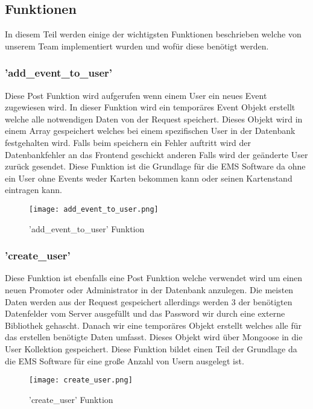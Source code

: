 			\subsection{Funktionen}
		 	In diesem Teil werden einige der wichtigsten Funktionen beschrieben welche von unserem Team implementiert wurden und wofür diese benötigt werden. 		 	
		 	\subsubsection{'add\_event\_to\_user'}
		 		Diese Post Funktion wird aufgerufen wenn einem User ein neues Event zugewiesen wird. In dieser Funktion wird ein temporäres Event Objekt erstellt welche alle notwendigen Daten von der Request speichert. Dieses Objekt wird in einem Array gespeichert welches bei einem spezifischen User in der Datenbank festgehalten wird. Falls beim speichern ein Fehler auftritt wird der Datenbankfehler an das Frontend geschickt anderen Falls wird der geänderte User zurück gesendet. Diese Funktion ist die Grundlage für die EMS Software da ohne ein User ohne Events weder Karten bekommen kann oder seinen Kartenstand eintragen kann.		 		
		 		\begin{figure}[H]
		 			\centering
		 			\texttt{[image: add\_event\_to\_user.png]}
		 			\caption{'add\_event\_to\_user' Funktion}
		 		\end{figure}	 	
		 	\subsubsection{'create\_user'}
		 		Diese Funktion ist ebenfalls eine Post Funktion welche verwendet wird um einen neuen Promoter oder Administrator in der Datenbank anzulegen. 
				 Die meisten Daten werden aus der Request gespeichert allerdings werden 3 der benötigten Datenfelder vom Server ausgefüllt und das Password wir durch eine externe Bibliothek gehascht. Danach wir eine temporäres Objekt erstellt welches alle für das erstellen benötigte Daten umfasst. Dieses Objekt wird über Mongoose in die User Kollektion gespeichert. Diese Funktion bildet einen Teil der Grundlage da die EMS Software für eine große Anzahl von Usern ausgelegt ist. 		 		
		 		\begin{figure}[H]
		 			\centering
		 			\texttt{[image: create\_user.png]}
		 			\caption{'create\_user' Funktion}
		 		\end{figure}		 		
